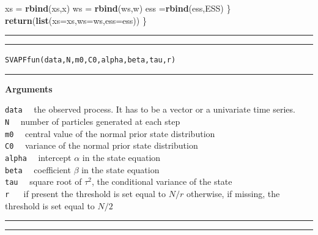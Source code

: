 \documentclass[
]{book}
\newenvironment{Shaded}{\begin{snugshade}}{\end{snugshade}}
\newcommand{\DataTypeTok}[1]{\textcolor[rgb]{0.13,0.29,0.53}{#1}}
\newcommand{\KeywordTok}[1]{\textcolor[rgb]{0.13,0.29,0.53}{\textbf{#1}}}
\newcommand{\NormalTok}[1]{#1}
\newcommand{\StringTok}[1]{\textcolor[rgb]{0.31,0.60,0.02}{#1}}
\theoremstyle{break}
\theoremstyle{nonumberplain}
\begin{document}
\begin{Shaded}
\begin{Highlighting}[]
\NormalTok{    xs =}\StringTok{ }\KeywordTok{rbind}\NormalTok{(xs,x)}
\NormalTok{    ws =}\StringTok{ }\KeywordTok{rbind}\NormalTok{(ws,w)}
\NormalTok{    ess =}\KeywordTok{rbind}\NormalTok{(ess,ESS)}
\NormalTok{  \}}
  \KeywordTok{return}\NormalTok{(}\KeywordTok{list}\NormalTok{(}\DataTypeTok{xs=}\NormalTok{xs,}\DataTypeTok{ws=}\NormalTok{ws,}\DataTypeTok{ess=}\NormalTok{ess))}
\NormalTok{\}}
\end{Highlighting}
\end{Shaded}

\hrule
\hrule

\texttt{SVAPFfun(data,N,m0,C0,alpha,beta,tau,r)}\\

\hrule

\textbf{Arguments}

\texttt{data} ~~the observed process. It has to be a vector or a
univariate time series.\\
\texttt{N} ~~number of particles generated at each step\\
\texttt{m0} ~~central value of the normal prior state distribution\\
\texttt{C0} ~~variance of the normal prior state distribution\\
\texttt{alpha} ~~intercept \(\alpha\) in the state equation\\
\texttt{beta} ~~coefficient \(\beta\) in the state equation\\
\texttt{tau} ~~square root of \(\tau^2\), the conditional variance of
the state\\
\texttt{r} ~~ if present the threshold is set equal to \(N/r\)
otherwise, if missing, the threshold is set equal to \(N/2\)

\hrule
\hrule
\end{document}
